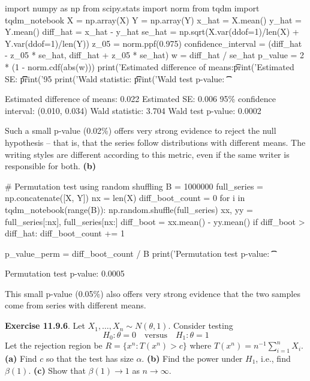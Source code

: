 \begin{python}
import numpy as np
from scipy.stats import norm
from tqdm import tqdm_notebook
X = np.array(X)
Y = np.array(Y)
x_hat = X.mean()
y_hat = Y.mean()
diff_hat = x_hat - y_hat
se_hat = np.sqrt(X.var(ddof=1)/len(X) + Y.var(ddof=1)/len(Y))
z_05 = norm.ppf(0.975)
confidence_interval = (diff_hat - z_05 * se_hat, diff_hat + z_05 * se_hat)
w = diff_hat / se_hat
p_value = 2 * (1 - norm.cdf(abs(w)))
print('Estimated difference of means:\t %
print('Estimated SE: \t\t\t %
print('95%
print('Wald statistic: \t\t %
print('Wald test p-value: \t\t %
\end{python}
\begin{console}
Estimated difference of means:   0.022
Estimated SE:                    0.006
95\% confidence interval:         (0.010, 0.034)
Wald statistic:                  3.704
Wald test p-value:               0.0002
\end{console}
Such a small p-value (0.02\%) offers very strong evidence to reject the
null hypothesis -- that is, that the series follow distributions with
different means. The writing styles are different according to this
metric, even if the same writer is responsible for both.
\textbf{(b)}

\begin{python}
# Permutation test using random shuffling
B = 1000000
full_series = np.concatenate([X, Y])
nx = len(X)
diff_boot_count = 0
for i in tqdm_notebook(range(B)):
    np.random.shuffle(full_series)
    xx, yy = full_series[:nx], full_series[nx:]
    diff_boot = xx.mean() - yy.mean()
    if diff_boot > diff_hat:
        diff_boot_count += 1
        
p_value_perm = diff_boot_count / B
print('Permutation test p-value: \t\t %
\end{python}
\begin{console}
Permutation test p-value:                0.0005
\end{console}
This small p-value (0.05\%) also offers very strong evidence that the
two samples come from series with different means.

\textbf{Exercise 11.9.6}. Let \(X_{1}, \dots, X_{n} \sim N(\theta, 1)\).
Consider testing
\[
H_{0}: \theta = 0 \quad \text{versus} \quad H_{1}: \theta = 1
\]
Let the rejection region be \(R = \{ x^{n} : T(x^{n}) > c \}\) where
\(T(x^{n}) = n^{-1} \sum_{i=1}^{n} X_{i}\).
\textbf{(a)} Find \(c\) so that the test has size \(\alpha\).
\textbf{(b)} Find the power under \(H_{1}\), i.e., find \(\beta(1)\).
\textbf{(c)} Show that \(\beta(1) \rightarrow 1\) as
\(n \rightarrow \infty\).

